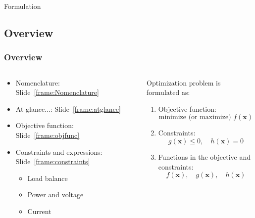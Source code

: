 \documentclass[
	11pt, %
	aspectratio=169, %
]{beamer}
\begin{document}
\begin{frame}[plain] %
	\begin{center}
		{\Huge Formulation}
		
		\bigskip\bigskip %
		
	\end{center}
\end{frame}


\subsection{Overview}

\begin{frame}
	\frametitle{Overview}

	\begin{columns}
	
		\begin{column}{0.5\textwidth}
			\begin{itemize}
				\item Nomenclature: Slide~\ref{frame:Nomenclature}
				\item At glance...: Slide~\ref{frame:atglance}
				\item Objective function: Slide~\ref{frame:objfunc}
				\item Constraints and expressions: Slide~\ref{frame:constraints}
					\begin{itemize}
						\item Load balance
						\item Power and voltage
						\item Current
					\end{itemize}
			\end{itemize}
		\end{column}

		\begin{column}{0.5\textwidth}
			Optimization problem is formulated as:
			\begin{enumerate}
				\item Objective function:
				\[
					\text{minimize (or maximize) } f(\mathbf{x})
				\]
				\item Constraints:
				\[
					g(\mathbf{x}) \leq 0, \quad h(\mathbf{x}) = 0
				\]
				\item Functions in the objective and constraints:
				\[
					f(\mathbf{x}), \quad g(\mathbf{x}), \quad h(\mathbf{x})
				\]
			\end{enumerate}
		\end{column}

	\end{columns}

\end{frame}
\end{document}
